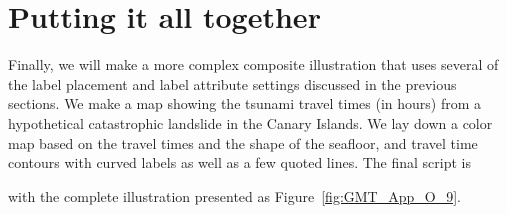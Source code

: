 
\section{Putting it all together}

Finally, we will make a more complex composite illustration that uses several of the
label placement and label attribute settings discussed in the previous sections.  We
make a map showing the tsunami travel times (in hours) from a hypothetical catastrophic
landslide in the Canary Islands.  We lay down a color map based on the travel times
and the shape of the seafloor, and travel time contours with curved labels as well
as a few quoted lines.  The final script is



\noindent
with the complete illustration presented as Figure~\ref{fig:GMT_App_O_9}.

